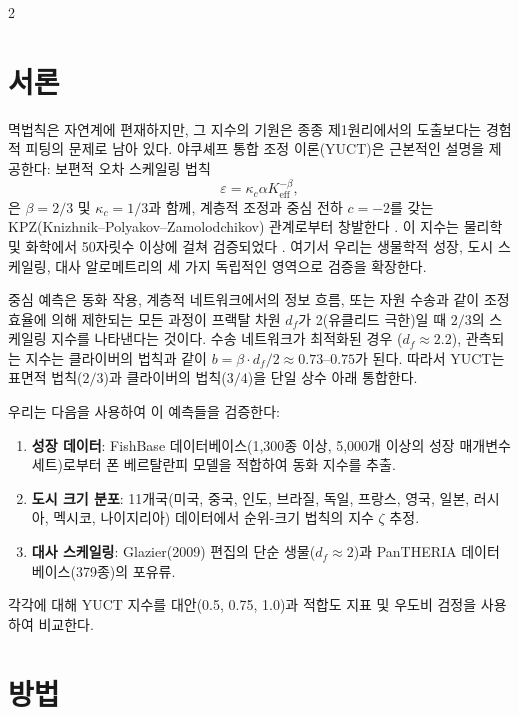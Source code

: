 \documentclass[11pt,a4paper]{article}
\newcommand{\eps}{\varepsilon}
\newcommand{\kappac}{\kappa_c}
\newcommand{\Keff}{K_{\mathrm{eff}}}
\newcommand{\betaf}{\beta}
\newcommand{\df}{d_f}
\begin{document}
	\vspace{0.4cm}
	\vspace*{-\baselineskip}
	\begin{multicols}{2}
		
		\section{서론}
		
		멱법칙은 자연계에 편재하지만, 그 지수의 기원은 종종 제1원리에서의 도출보다는 경험적 피팅의 문제로 남아 있다. 야쿠셰프 통합 조정 이론(YUCT)은 근본적인 설명을 제공한다: 보편적 오차 스케일링 법칙
		\[
		\eps = \kappac \alpha \Keff^{-\betaf},
		\]
		은 \(\betaf = 2/3\) 및 \(\kappac = 1/3\)과 함께, 계층적 조정과 중심 전하 \(c = -2\)를 갖는 KPZ(Knizhnik–Polyakov–Zamolodchikov) 관계로부터 창발한다 \cite{AppendixY, AppendixL}. 이 지수는 물리학 및 화학에서 50자릿수 이상에 걸쳐 검증되었다 \cite{AppendixC, AppendixG}. 여기서 우리는 생물학적 성장, 도시 스케일링, 대사 알로메트리의 세 가지 독립적인 영역으로 검증을 확장한다.
		
		중심 예측은 동화 작용, 계층적 네트워크에서의 정보 흐름, 또는 자원 수송과 같이 조정 효율에 의해 제한되는 모든 과정이 프랙탈 차원 \(\df\)가 2(유클리드 극한)일 때 \(2/3\)의 스케일링 지수를 나타낸다는 것이다. 수송 네트워크가 최적화된 경우 (\(\df \approx 2.2\)), 관측되는 지수는 클라이버의 법칙과 같이 \(b = \betaf \cdot \df/2 \approx 0.73\)–\(0.75\)가 된다. 따라서 YUCT는 표면적 법칙(\(2/3\))과 클라이버의 법칙(\(3/4\))을 단일 상수 아래 통합한다.
		
		우리는 다음을 사용하여 이 예측들을 검증한다:
		\begin{enumerate}
			\item \textbf{성장 데이터}: FishBase 데이터베이스(1,300종 이상, 5,000개 이상의 성장 매개변수 세트)로부터 폰 베르탈란피 모델을 적합하여 동화 지수를 추출.
			\item \textbf{도시 크기 분포}: 11개국(미국, 중국, 인도, 브라질, 독일, 프랑스, 영국, 일본, 러시아, 멕시코, 나이지리아) 데이터에서 순위-크기 법칙의 지수 \(\zeta\) 추정.
			\item \textbf{대사 스케일링}: Glazier(2009) 편집의 단순 생물(\(\df \approx 2\))과 PanTHERIA 데이터베이스(379종)의 포유류.
		\end{enumerate}
		각각에 대해 YUCT 지수를 대안(0.5, 0.75, 1.0)과 적합도 지표 및 우도비 검정을 사용하여 비교한다.
		
		\section{방법}
		

\end{multicols}
\end{document}

